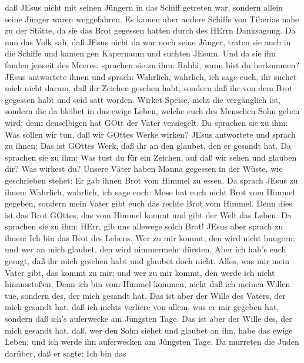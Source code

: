 daß JEsus nicht mit seinen Jüngern in das Schiff getreten war, sondern
allein seine Jünger waren weggefahren.  Es kamen aber
andere Schiffe von Tiberias nahe zu der Stätte, da sie das Brot gegessen
hatten durch des HErrn Danksagung.  Da nun das Volk sah,
daß JEsus nicht da war noch seine Jünger, traten sie auch in die Schiffe
und kamen gen Kapernaum und suchten JEsum.  Und da sie ihn
fanden jenseit des Meeres, sprachen sie zu ihm: Rabbi, wann bist du
herkommen?  JEsus antwortete ihnen und sprach: Wahrlich,
wahrlich, ich sage euch, ihr suchet mich nicht darum, daß ihr Zeichen
gesehen habt, sondern daß ihr von dem Brot gegessen habt und seid satt
worden.  Wirket Speise, nicht die vergänglich ist, sondern
die da bleibet in das ewige Leben, welche euch des Menschen Sohn geben
wird; denn denselbigen hat GOtt der Vater versiegelt.  Da
sprachen sie zu ihm: Was sollen wir tun, daß wir GOttes Werke wirken?
 JEsus antwortete und sprach zu ihnen: Das ist GOttes Werk,
daß ihr an den glaubet, den er gesandt hat.  Da sprachen
sie zu ihm: Was tust du für ein Zeichen, auf daß wir sehen und glauben
dir? Was wirkest du?  Unsere Väter haben Manna gegessen in
der Wüste, wie geschrieben stehet: Er gab ihnen Brot vom Himmel zu
essen.  Da sprach JEsus zu ihnen: Wahrlich, wahrlich, ich
sage euch: Mose hat euch nicht Brot vom Himmel gegeben, sondern mein
Vater gibt euch das rechte Brot vom Himmel.  Denn dies ist
das Brot GOttes, das vom Himmel kommt und gibt der Welt das Leben.
 Da sprachen sie zu ihm: HErr, gib uns allewege solch Brot!
 JEsus aber sprach zu ihnen: Ich bin das Brot des Lebens.
Wer zu mir kommt, den wird nicht hungern; und wer an mich glaubet, den
wird nimmermehr dürsten.  Aber ich hab's euch gesagt, daß
ihr mich gesehen habt und glaubet doch nicht.  Alles, was
mir mein Vater gibt, das kommt zu mir; und wer zu mir kommt, den werde
ich nicht hinausstoßen.  Denn ich bin vom Himmel kommen,
nicht daß ich meinen Willen tue, sondern des, der mich gesandt hat.
 Das ist aber der Wille des Vaters, der mich gesandt hat,
daß ich nichts verliere von allem, was er mir gegeben hat, sondern daß
ich's auferwecke am Jüngsten Tage.  Das ist aber der Wille
des, der mich gesandt hat, daß, wer den Sohn siehet und glaubet an ihn,
habe das ewige Leben; und ich werde ihn auferwecken am Jüngsten Tage.
 Da murreten die Juden darüber, daß er sagte: Ich bin das

